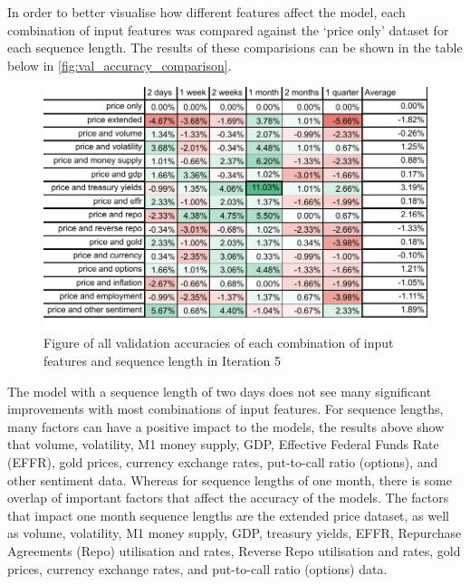 In order to better visualise how different features affect the model, each combination of input features was compared against the `price only' dataset for each sequence length.
The results of these comparisions can be shown in the table below in \autoref{fig:val_accuracy_comparison}.

\begin{figure}[ht]
    \centering
    \includegraphics[width=0.95\columnwidth]{figures/results/final/val_accuracy_comparison.pdf}
    \caption[Best validation accuracies for Iteration 5]{Figure of all validation accuracies of each combination of input features and sequence length in Iteration 5}
    \label{fig:val_accuracy_comparison}
\end{figure}
\FloatBarrier

The model with a sequence length of two days does not see many significant improvements with most combinations of input features.
For sequence lengths, many factors can have a positive impact to the models, the results above show that volume, volatility,
M1 money supply, GDP, Effective Federal Funds Rate (EFFR), gold prices, currency exchange rates, put-to-call ratio (options), and other
sentiment data. Whereas for sequence lengths of one month, there is some overlap of important factors that affect the accuracy of the models.
The factors that impact one month sequence lengths are the extended price dataset, as well as volume, volatility, M1 money supply, GDP, 
treasury yields, EFFR, Repurchase Agreements (Repo) utilisation and rates, Reverse Repo utilisation and rates, gold prices, currency exchange rates,
and put-to-call ratio (options) data.

